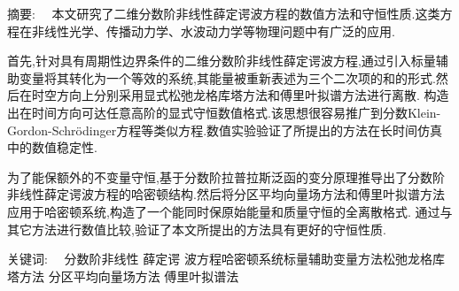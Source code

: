 
\begin{ChineseAbstract}[副教授]%
\item {\heiti 摘要:\ \ }
本文研究了二维分数阶非线性薛定谔波方程的数值方法和守恒性质.这类方程在非线性光学、传播动力学、水波动力学等物理问题中有广泛的应用.

首先,针对具有周期性边界条件的二维分数阶非线性薛定谔波方程,通过引入标量辅助变量将其转化为一个等效的系统,其能量被重新表述为三个二次项的和的形式.然后在时空方向上分别采用显式松弛龙格库塔方法和傅里叶拟谱方法进行离散.
构造出在时间方向可达任意高阶的显式守恒数值格式.该思想很容易推广到分数Klein-Gordon-Schr{\"o}dinger方程等类似方程.数值实验验证了所提出的方法在长时间仿真中的数值稳定性.

为了能保额外的不变量守恒,基于分数阶拉普拉斯泛函的变分原理推导出了分数阶非线性薛定谔波方程的哈密顿结构.然后将分区平均向量场方法和傅里叶拟谱方法应用于哈密顿系统,构造了一个能同时保原始能量和质量守恒的全离散格式.
通过与其它方法进行数值比较,验证了本文所提出的方法具有更好的守恒性质.

\item {\heiti 关键词:\ \ } 分数阶非线性 薛定谔 波方程\qquad 哈密顿系统\qquad 标量辅助变量方法\qquad 松弛龙格库塔方法 \qquad 分区平均向量场方法 \qquad 傅里叶拟谱法
\end{ChineseAbstract}
